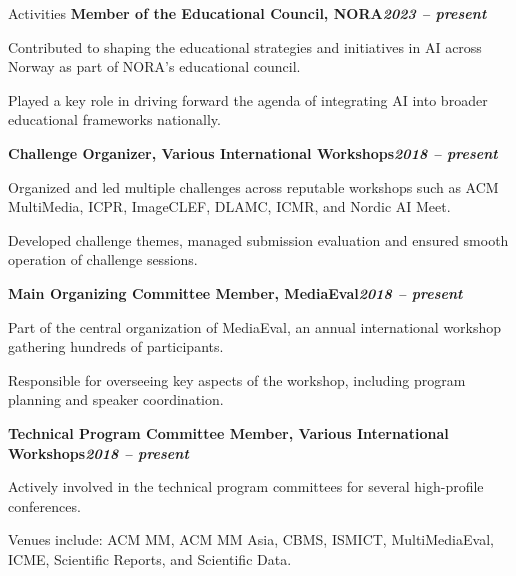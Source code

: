 \begin{rubric}{Activities}
\entry*[]%
\textbf{Member of the Educational Council, NORA\hfill\textit{2023 -- present}} \par
\begin{compactitem}
    \item Contributed to shaping the educational strategies and initiatives in AI across Norway as part of NORA's educational council.
    \item Played a key role in driving forward the agenda of integrating AI into broader educational frameworks nationally.
    \vspace{-12pt}
\end{compactitem}
% 
\entry*[]%
\textbf{Challenge Organizer, Various International Workshops\hfill\textit{2018 -- present}} \par
\begin{compactitem}
    \item Organized and led multiple challenges across reputable workshops such as ACM MultiMedia, ICPR, ImageCLEF, DLAMC, ICMR, and Nordic AI Meet. 
    \item Developed challenge themes, managed submission evaluation and ensured smooth operation of challenge sessions.
    \vspace{-12pt}
\end{compactitem}
%
\entry*[]%
\textbf{Main Organizing Committee Member, MediaEval\hfill\textit{2018 -- present}} \par
\begin{compactitem}
    \item Part of the central organization of MediaEval, an annual international workshop gathering hundreds of participants.
    \item Responsible for overseeing key aspects of the workshop, including program planning and speaker coordination.
    \vspace{-12pt}
\end{compactitem}
% 
\entry*[]%
\textbf{Technical Program Committee Member, Various International Workshops\hfill\textit{2018 -- present}} \par
\begin{compactitem}
    \item Actively involved in the technical program committees for several high-profile conferences.
    \item Venues include: ACM MM, ACM MM Asia, CBMS, ISMICT, MultiMediaEval, ICME, Scientific Reports, and Scientific Data.
    \vspace{-12pt}

\end{compactitem}
\end{rubric}
